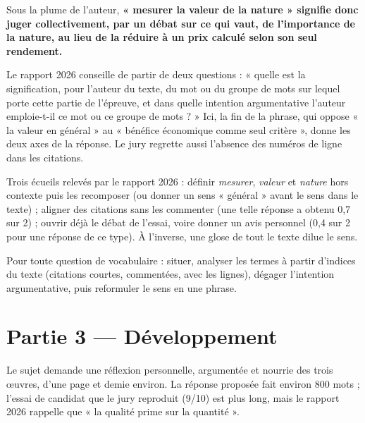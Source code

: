 \documentclass[11pt,a4paper]{article}
\begin{document}
Sous la plume de l'auteur, \textbf{« mesurer la valeur de la nature » signifie donc juger collectivement, par un débat sur ce qui vaut, de l'importance de la nature, au lieu de la réduire à un prix calculé selon son seul rendement.}

\begin{jury}

Le rapport 2026 conseille de partir de deux questions : « quelle est la signification, pour l'auteur du texte, du mot ou du groupe de mots sur lequel porte cette partie de l'épreuve, et dans quelle intention argumentative l'auteur emploie-t-il ce mot ou ce groupe de mots ? » Ici, la fin de la phrase, qui oppose « la valeur en général » au « bénéfice économique comme seul critère », donne les deux axes de la réponse. Le jury regrette aussi l'absence des numéros de ligne dans les citations.

\end{jury}

\begin{piege}

Trois écueils relevés par le rapport 2026 : définir \emph{mesurer}, \emph{valeur} et \emph{nature} hors contexte puis les recomposer (ou donner un sens « général » avant le sens dans le texte) ; aligner des citations sans les commenter (une telle réponse a obtenu 0,7 sur 2) ; ouvrir déjà le débat de l'essai, voire donner un avis personnel (0,4 sur 2 pour une réponse de ce type). À l'inverse, une glose de tout le texte dilue le sens.

\end{piege}

\begin{methode}

Pour toute question de vocabulaire : situer, analyser les termes à partir d'indices du texte (citations courtes, commentées, avec les lignes), dégager l'intention argumentative, puis reformuler le sens en une phrase.

\end{methode}

\hypertarget{partie-3-duxe9veloppement}{%
\section{Partie 3 --- Développement}\label{partie-3-duxe9veloppement}}

Le sujet demande une réflexion personnelle, argumentée et nourrie des trois œuvres, d'une page et demie environ. La réponse proposée fait environ 800 mots ; l'essai de candidat que le jury reproduit (9/10) est plus long, mais le rapport 2026 rappelle que « la qualité prime sur la quantité ».
\end{document}
